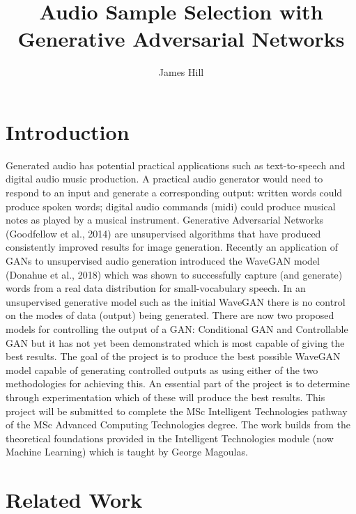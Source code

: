\documentclass[titlepage]{article}
\title{Audio Sample Selection with Generative Adversarial Networks}
\author{James Hill}
\date{}
\begin{document}
\maketitle

\section{Introduction}

Generated audio has potential practical applications such as text-to-speech and digital audio music production.
A practical audio generator would need to respond to an input and generate a corresponding output: written words could produce spoken words; digital audio commands (midi) could produce musical notes as played by a musical instrument.
\newline
\newline
Generative Adversarial Networks (Goodfellow et al., 2014) are unsupervised algorithms that have produced consistently improved results for image generation.
Recently an application of GANs to unsupervised audio generation introduced the WaveGAN model (Donahue et al., 2018) which was shown to successfully capture (and generate) words from a real data distribution for small-vocabulary speech.
\newline
\newline
In an unsupervised generative model such as the initial WaveGAN there is no control on the modes of data (output) being generated.
There are now two proposed models for controlling the output of a GAN: Conditional GAN and Controllable GAN but it has not yet been demonstrated which is most capable of giving the best results.
\newline
\newline
The goal of the project is to produce the best possible WaveGAN model capable of generating controlled outputs as using either of the two methodologies for achieving this.
An essential part of the project is to determine through experimentation which of these will produce the best results.
\newline
\newline
This project will be submitted to complete the MSc Intelligent Technologies pathway of the MSc Advanced Computing Technologies degree.
The work builds from the theoretical foundations provided in the Intelligent Technologies module (now Machine Learning) which is taught by George Magoulas.

\section{Related Work}
\end{document}
